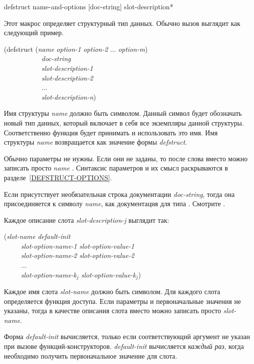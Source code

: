 \begin{defmac}
defstruct name-and-options [doc-string] {slot-description}*

Этот макрос определяет структурный тип данных.
Обычно вызов  выглядит как следующий пример.
\begin{lisp}
(defstruct (\emph{name} \emph{option-1} \emph{option-2} ... \emph{option-m}) \\
~~~~~~~~~~~\emph{doc-string} \\
~~~~~~~~~~~\emph{slot-description-1} \\
~~~~~~~~~~~\emph{slot-description-2} \\
~~~~~~~~~~~... \\
~~~~~~~~~~~\emph{slot-description-n}) \\
\end{lisp}
Имя структуры \emph{name} должно быть символом. Данный символ будет
обозначать новый тип данных, который включает в себя все экземпляры
данной структуры. Соответственно функция  будет принимать
и использовать это имя. Имя структуры \emph{name} возвращается как
значение формы \emph{defstruct}.

Обычно параметры не нужны. Если они не заданы, то после слова
 вместо  можно записать просто
\emph{name} . Синтаксис параметров и их смысл раскрываются в
разделе~\ref{DEFSTRUCT-OPTIONS}.

Если присутствует необязательная строка документации
\emph{doc-string}, тогда она присоединяется к символу \emph{name}, как
документация для типа . Смотрите .

Каждое описание слота \emph{slot-description-j} выглядит так:
\begin{lisp}
(\emph{slot-name} \emph{default-init} \\
~~~~~\emph{slot-option-name-1} \emph{slot-option-value-1} \\
~~~~~\emph{slot-option-name-2} \emph{slot-option-value-2} \\
~~~~~... \\
~~~~~\emph{slot-option-name-k${}_{j}$} \emph{slot-option-value-k${}_{j}$})
\end{lisp}
Каждое имя слота \emph{slot-name} должно быть символом. Для каждого
слота определяется функция доступа. Если параметры и первоначальные
значения не указаны, тогда в качестве описания слота вместо
 можно записать просто \emph{slot-name}.

Форма \emph{default-init} вычисляется, только если соответствующий аргумент не
указан при вызове функций-конструкторов.
\emph{default-init} вычисляется \emph{каждый раз}, когда необходимо получить
первоначальное значение для слота.


\end{defmac}
